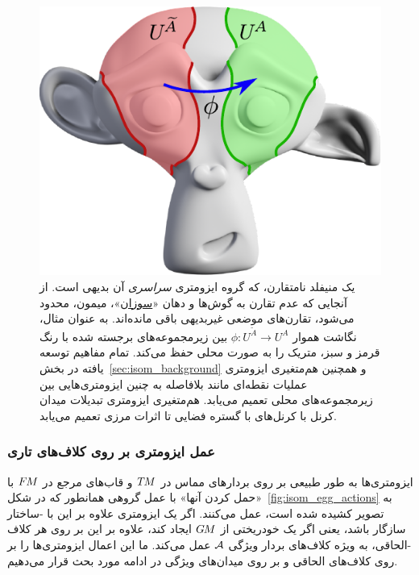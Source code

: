 \begin{figure}
    \centering
    \hspace{1.ex}
    \includegraphics[width=.42\textwidth]{figures/suzanne_local_isometry.pdf}
    \hspace{2.ex}
    \captionsetup{width=.89\textwidth}
    \caption[]{\small
        یک منیفلد نامتقارن، که گروه ایزومتری \emph{سراسری} آن بدیهی است.
        از آنجایی که عدم تقارن به گوش‌ها و دهان
        «\href{https://en.wikipedia.org/wiki/Blender_(software)\#Suzanne}{سوزان}»،
        میمون، محدود می‌شود، تقارن‌های موضعی غیربدیهی باقی مانده‌اند.
        به عنوان مثال، نگاشت هموار ${\phi: U^{\widetilde{A}} \to U^A}$ بین زیرمجموعه‌های برجسته شده با رنگ قرمز و سبز، متریک را به صورت محلی حفظ می‌کند.
        تمام مفاهیم توسعه یافته در بخش~\ref{sec:isom_background} و همچنین هم‌متغیری ایزومتری عملیات نقطه‌ای مانند \onexonesfarsi بلافاصله به چنین ایزومتری‌هایی بین زیرمجموعه‌های محلی تعمیم می‌یابد. 
        هم‌متغیری ایزومتری تبدیلات میدان کرنل با کرنل‌های با گستره فضایی تا اثرات مرزی تعمیم می‌یابد.
        }
    \label{fig:suzanne_local_isometry}
\end{figure}











\subsubsection{عمل ایزومتری بر روی کلاف‌های تاری}
\label{sec:isom_action_bundles}

ایزومتری‌ها به طور طبیعی بر روی بردارهای مماس در $T\mkern-1.5muM$ و قاب‌های مرجع در $F\mkern-1.5muM$ با «حمل کردن آنها» با عمل گروهی همانطور که در شکل~\ref{fig:isom_egg_actions} به تصویر کشیده شده است، عمل می‌کنند.
اگر یک ایزومتری علاوه بر این با -ساختار سازگار باشد، یعنی اگر یک خودریختی از $G\mkern-1.4muM$ ایجاد کند، علاوه بر این بر روی هر کلاف -الحاقی، به ویژه کلاف‌های بردار ویژگی $\mathcal{A}$ عمل می‌کند.
ما این اعمال ایزومتری‌ها را بر روی کلاف‌های الحاقی و بر روی میدان‌های ویژگی در ادامه مورد بحث قرار می‌دهیم.




